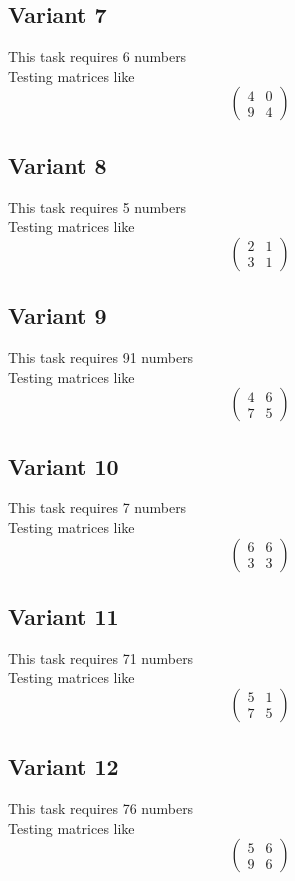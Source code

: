 \documentclass[11pt]{article}
\begin{document}
\subsection*{Variant 7}
This task requires 6 numbers\\
Testing matrices like \[ \begin{pmatrix} 4 & 0\\ 9 & 4 \end{pmatrix} \]

\subsection*{Variant 8}
This task requires 5 numbers\\
Testing matrices like \[ \begin{pmatrix} 2 & 1\\ 3 & 1 \end{pmatrix} \]

\subsection*{Variant 9}
This task requires 91 numbers\\
Testing matrices like \[ \begin{pmatrix} 4 & 6\\ 7 & 5 \end{pmatrix} \]

\subsection*{Variant 10}
This task requires 7 numbers\\
Testing matrices like \[ \begin{pmatrix} 6 & 6\\ 3 & 3 \end{pmatrix} \]

\subsection*{Variant 11}
This task requires 71 numbers\\
Testing matrices like \[ \begin{pmatrix} 5 & 1\\ 7 & 5 \end{pmatrix} \]

\subsection*{Variant 12}
This task requires 76 numbers\\
Testing matrices like \[ \begin{pmatrix} 5 & 6\\ 9 & 6 \end{pmatrix} \]
\end{document}
